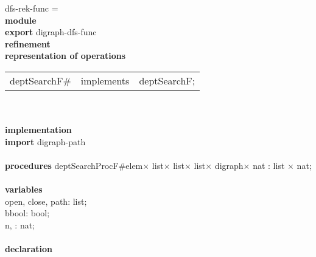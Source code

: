 \begin{tabbing}\label{dfs-rek-func-module}%
dfs-rek-func = \\
{\bf mod}\={\bf ule}\+\\
{\bf export} digraph-dfs-func\\
{\bf ref}\={\bf inement}\+\\
{\bf rep}\= {\bf resentation of operations}\+\\
\begin{tabular}{lcl}
deptSearchF\# & implements & deptSearchF;
\end{tabular}\-\\

\\
{\bf implementation}\\
{\bf import} digraph-path\\
\\
{\bf procedures} deptSearchProcF\#elem$\times$ list$\times$ list$\times$ list$\times$ digraph$\times$ nat : list $\times$ nat;\\
\\
{\bf vari}\={\bf ables}\+\\
open, close, path: list;\\
bbool: bool;\\
n, : nat;
\-\\
\\

               {\bf declaration}
\end{tabbing}

